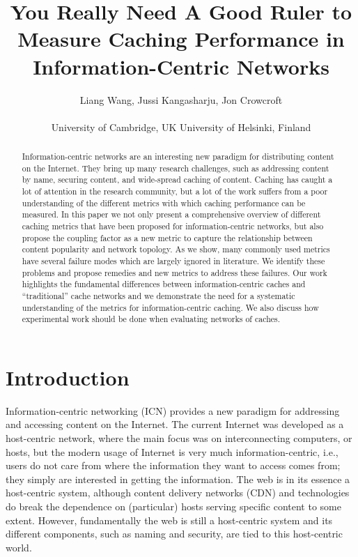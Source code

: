 \documentclass{sigcomm-alternate}
\title{You Really Need A Good Ruler to Measure Caching Performance in Information-Centric Networks}
\author{Liang Wang, Jussi Kangasharju, Jon Crowcroft\\ \\University of Cambridge, UK \qquad University of Helsinki, Finland}
\begin{document}
\maketitle

\begin{abstract}
  Information-centric networks are an interesting new paradigm for distributing content on the Internet.
  They bring up many research challenges, such as addressing content by name, securing content, and wide-spread caching of content.
  Caching has caught a lot of attention in the research community, but a lot of the work suffers from a poor understanding of the different metrics with which caching performance can be measured.
  In this paper we not only present a comprehensive overview of different caching metrics that have been proposed for information-centric networks, but also propose the coupling factor as a new metric to capture the relationship between content popularity and network topology.
  As we show, many commonly used metrics have several failure modes which are largely ignored in literature.
  We identify these problems and propose remedies and new metrics to address these failures.
  Our work highlights the fundamental differences between information-centric caches and ``traditional'' cache networks and we demonstrate the need for a systematic understanding of the metrics for information-centric caching.
  We also discuss how experimental work should be done when evaluating networks of caches.
\end{abstract}


\section{Introduction}
\label{sec:intro}





Information-centric networking (ICN) provides a new paradigm for addressing and accessing content on the Internet.
The current Internet was developed as a host-centric network, where the main focus was on interconnecting computers, or hosts, but the modern usage of Internet is very much information-centric, i.e., users do not care from where the information they want to access comes from; they simply are interested in getting the information.
The web is in its essence a host-centric system, although content delivery networks (CDN) and technologies do break the dependence on (particular) hosts serving specific content to some extent.
However, fundamentally the web is still a host-centric system and its different components, such as naming and security, are tied to this host-centric world.
\end{document}
